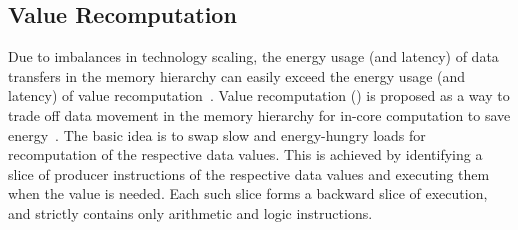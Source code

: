 \subsection{Value Recomputation}
\label{sec:recmp}

Due to imbalances in technology scaling,  the energy usage (and latency) of data transfers in the memory hierarchy can easily exceed the energy usage (and latency) of value recomputation~\cite{Horow}.
Value recomputation (\recomp) is proposed as a way to trade off data movement in the memory hierarchy for in-core computation to save energy~\cite{amnesiac17,taxonomy18}.
%
The basic idea is to swap slow and energy-hungry loads for recomputation of the respective data values.  
This is achieved by identifying a slice of producer instructions of the respective data values and executing them when the value is needed.
Each such slice forms a backward slice of execution, and strictly contains only arithmetic and logic instructions. 

